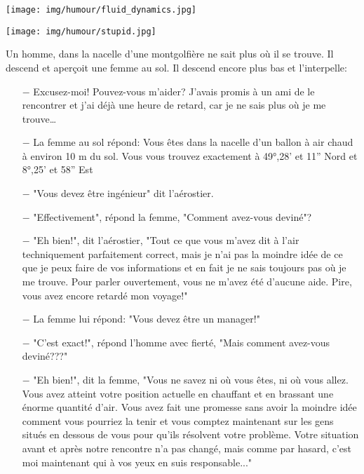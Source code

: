 \begin{center}\underline{\hspace{5 cm}}\end{center}
	\begin{center}
	\texttt{[image: img/humour/fluid\_dynamics.jpg]}
	\end{center}

	\begin{center}
	\texttt{[image: img/humour/stupid.jpg]}
	\end{center}
\begin{center}\underline{\hspace{5 cm}}\end{center}

Un homme, dans la nacelle d'une montgolfière ne sait plus où il se trouve. Il descend et aperçoit une femme au sol. Il descend encore plus bas et l'interpelle:
\begin{itemize}
	\item[$-$] Excusez-moi! Pouvez-vous m'aider? J'avais promis à un ami de le rencontrer et j'ai déjà une heure de retard, car je ne sais plus où je me trouve…

	\item[$-$] La femme au sol répond: Vous êtes dans la nacelle d'un ballon à air chaud à environ 10 m du sol. Vous vous trouvez exactement à 49°,28' et 11'' Nord et 8°,25' et 58'' Est 

	\item[$-$] "Vous devez être ingénieur" dit l'aérostier. 

	\item[$-$] "Effectivement", répond la femme, "Comment avez-vous deviné"?

	\item[$-$] "Eh bien!", dit l'aérostier, "Tout ce que vous m'avez dit à l'air techniquement parfaitement correct, mais je n'ai pas la moindre idée de ce que je peux faire de vos informations et en fait je ne sais toujours pas où je me trouve. Pour parler ouvertement, vous ne m'avez été d'aucune aide. Pire, vous avez encore retardé mon voyage!"

	\item[$-$] La femme lui répond: "Vous devez être un manager!"

	\item[$-$] "C'est exact!", répond l'homme avec fierté, "Mais comment avez-vous deviné???"
	
	\item[$-$] "Eh bien!", dit la femme, "Vous ne savez ni où vous êtes, ni où vous allez. Vous avez atteint votre position actuelle en chauffant et en brassant une énorme quantité d'air. Vous avez fait une promesse sans avoir la moindre idée comment vous pourriez la tenir et vous comptez maintenant sur les gens situés en dessous de vous pour qu'ils résolvent votre problème. Votre situation avant et après notre rencontre n'a pas changé, mais comme par hasard, c'est moi maintenant qui à vos yeux en suis responsable..."
\end{itemize}

